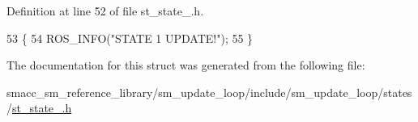 Definition at line 52 of file st\+\_\+state\+\_.\+h.


\begin{DoxyCode}
53     \{
54         ROS\_INFO(\textcolor{stringliteral}{"STATE 1 UPDATE!"});
55     \}
\end{DoxyCode}


The documentation for this struct was generated from the following file\+:\begin{DoxyCompactItemize}
\item 
smacc\+\_\+sm\+\_\+reference\+\_\+library/sm\+\_\+update\+\_\+loop/include/sm\+\_\+update\+\_\+loop/states/\hyperlink{sm__update__loop_2include_2sm__update__loop_2states_2st__state__1_8h}{st\+\_\+state\+\_.\+h}\end{DoxyCompactItemize}
